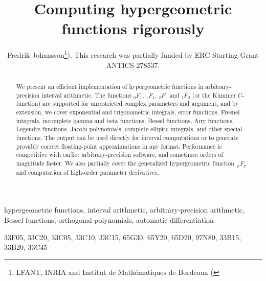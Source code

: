 \documentclass[review,nohypdvips]{siamart0216}
\begin{document}
\title{Computing hypergeometric functions rigorously}
\author{Fredrik Johansson\thanks{LFANT, INRIA and Institut de Math\'{e}matiques de Bordeaux
  (\protect{}}). This research was partially funded by ERC Starting Grant ANTICS 278537.}
\date{}

\maketitle

\begin{abstract}
We present an efficient implementation of hypergeometric functions
in arbitrary-precision interval arithmetic.
The functions ${}_0F_1$, ${}_1F_1$, ${}_2F_1$ and ${}_2F_0$
(or the Kummer $U$-function) are supported
for unrestricted complex parameters and argument,
and by extension,
we cover
exponential and trigonometric integrals, error functions, Fresnel integrals,
incomplete gamma and beta functions, Bessel functions, Airy functions,
Legendre functions, Jacobi polynomials,
complete elliptic integrals, and other special functions.
The output can be used directly for interval computations
or to generate provably correct floating-point approximations in any format.
Performance is competitive with earlier arbitrary-precision software, and
sometimes orders of magnitude faster.
We also partially cover the generalized hypergeometric function~${}_pF_q$
and computation of high-order parameter derivatives.
\end{abstract}

\begin{keywords}
hypergeometric functions, interval arithmetic, arbitrary-precision arithmetic, Bessel functions, orthogonal polynomials, automatic differentiation
\end{keywords}

\begin{AMS}
 33F05, %
 33C20, %
 33C05, %
 33C10, %
 33C15, %
 65G30, %
 65Y20, %
 65D20, %
 97N80, %
 33B15, %
 33B20, %
 33C45 %
\end{AMS}
\end{document}
